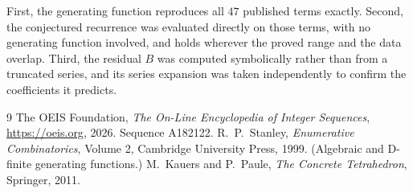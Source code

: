 \documentclass[11pt,a4paper]{article}
\theoremstyle{plain}
\theoremstyle{definition}
\begin{document}
First, the generating function reproduces all $47$ published terms exactly. Second,
the conjectured recurrence was evaluated directly on those terms, with no generating function
involved, and holds wherever the proved range and the data overlap. Third, the residual $B$ was
computed symbolically rather than from a truncated series, and its series expansion was taken
independently to confirm the coefficients it predicts.

\begin{thebibliography}{9}
 The OEIS Foundation, \emph{The On-Line Encyclopedia of Integer Sequences},
\url{https://oeis.org}, 2026. Sequence A182122.
 R.~P.~Stanley, \emph{Enumerative Combinatorics}, Volume 2, Cambridge
University Press, 1999. (Algebraic and D-finite generating functions.)
 M.~Kauers and P.~Paule, \emph{The Concrete Tetrahedron}, Springer, 2011.
\end{thebibliography}
\end{document}
